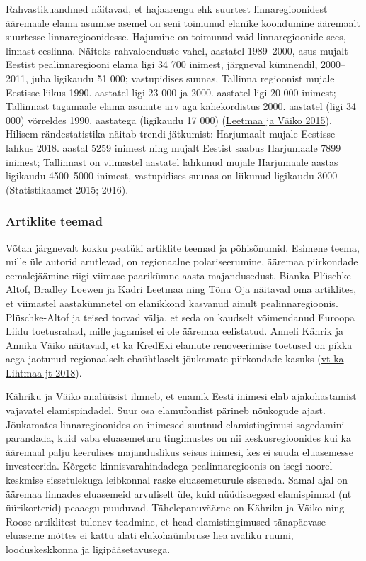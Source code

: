 \documentclass[estonian,]{article}
\begin{document}
Rahvastikuandmed näitavad, et hajaarengu ehk suurtest linnaregioonidest ääremaale elama asumise asemel on seni toimunud elanike koondumine ääremaalt suurtesse linnaregioonidesse. Hajumine on toimunud vaid linnaregioonide sees, linnast eeslinna. Näiteks rahvaloenduste vahel, aastatel 1989--2000, asus mujalt Eestist pealinnaregiooni elama ligi 34 700 inimest, järgneval kümnendil, 2000--2011, juba ligikaudu 51 000; vastupidises suunas, Tallinna regioonist mujale Eestisse liikus 1990. aastatel ligi 23 000 ja 2000. aastatel ligi 20 000 inimest; Tallinnast tagamaale elama asunute arv aga kahekordistus 2000. aastatel (ligi 34 000) võrreldes 1990. aastatega (ligikaudu 17 000) (\protect\hyperlink{Leetmaa2015}{Leetmaa ja Väiko 2015}). Hilisem rändestatistika näitab trendi jätkumist: Harjumaalt mujale Eestisse lahkus 2018. aastal 5259 inimest ning mujalt Eestist saabus Harjumaale 7899 inimest; Tallinnast on viimastel aastatel lahkunud mujale Harjumaale aastas ligikaudu 4500--5000 inimest, vastupidises suunas on liikunud ligikaudu 3000 (Statistikaamet 2015; 2016).

\hypertarget{artiklite-teemad}{%
\subsubsection*{Artiklite teemad}\label{artiklite-teemad}}

Võtan järgnevalt kokku peatüki artiklite teemad ja põhisõnumid. Esimene teema, mille üle autorid arutlevad, on regionaalne polariseerumine, ääremaa piirkondade eemalejäämine riigi viimase paarikümne aasta majandusedust. Bianka Plüschke-Altof, Bradley Loewen ja Kadri Leetmaa ning Tõnu Oja näitavad oma artiklites, et viimastel aastakümnetel on elanikkond kasvanud ainult pealinnaregioonis. Plüschke-Altof ja teised toovad välja, et seda on kaudselt võimendanud Euroopa Liidu toetusrahad, mille jagamisel ei ole ääremaa eelistatud. Anneli Kährik ja Annika Väiko näitavad, et ka KredExi elamute renoveerimise toetused on pikka aega jaotunud regionaalselt ebaühtlaselt jõukamate piirkondade kasuks (\protect\hyperlink{Lihtmaa2018}{vt ka Lihtmaa jt 2018}).

Kähriku ja Väiko analüüsist ilmneb, et enamik Eesti inimesi elab ajakohastamist vajavatel elamispindadel. Suur osa elamufondist pärineb nõukogude ajast. Jõukamates linnaregioonides on inimesed suutnud elamistingimusi sagedamini parandada, kuid vaba eluasemeturu tingimustes on nii keskusregioonides kui ka ääremaal palju keerulises majanduslikus seisus inimesi, kes ei suuda eluasemesse investeerida. Kõrgete kinnisvarahindadega pealinnaregioonis on isegi noorel keskmise sissetulekuga leibkonnal raske eluasemeturule siseneda. Samal ajal on ääremaa linnades eluasemeid arvuliselt üle, kuid nüüdisaegsed elamispinnad (nt üürikorterid) peaaegu puuduvad. Tähelepanuväärne on Kähriku ja Väiko ning Roose artiklitest tulenev teadmine, et head elamistingimused tänapäevase eluaseme mõttes ei kattu alati elukohaümbruse hea avaliku ruumi, looduskeskkonna ja ligipääsetavusega.
\end{document}
